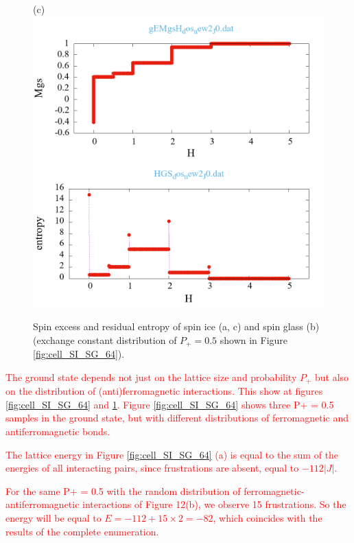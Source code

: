 \documentclass[preprint,12pt]{elsarticle}
\begin{document}
\begin{figure}[H]
\begin{minipage}[h]{0.32\linewidth}
		\end{minipage}
		\hfill
		\begin{minipage}[h]{0.32\linewidth}
			\centering(c)
			\includegraphics[width=1\linewidth]{pictures/_multiplot_SI64_J0}
		\end{minipage}
		
		\caption{Spin excess and residual entropy of spin ice (a, c) and spin glass (b) (exchange constant distribution of $P_+ = 0.5$ shown in Figure \ref{fig:cell_SI_SG_64}).}
		\label{fig:_multiplot_SI_SG_64}
		
	\end{figure}
	
	\textcolor{red}{The ground state depends not just on the lattice size and probability $P_+$ but also on the distribution of (anti)ferromagnetic interactions. This show at figures \ref{fig:cell_SI_SG_64} and \ref{fig:_multiplot_SI_SG_64}. Figure \ref{fig:cell_SI_SG_64} shows three P+ = 0.5 samples in the ground state, but with different distributions of ferromagnetic and antiferromagnetic bonds.}
	
	\textcolor{red}{The lattice energy in Figure \ref{fig:cell_SI_SG_64} (a) is equal to the sum of the energies of all interacting pairs, since frustrations are absent, equal to $-112|J|$.}
	
	\textcolor{red}{For the same P+ = 0.5 with the random distribution of ferromagnetic-antiferromagnetic interactions of Figure 12(b), we observe 15 frustrations. So the energy will be equal to $E = -112 + 15\times2 = -82$, which coincides with the results of the complete enumeration.}
	
\end{document}
